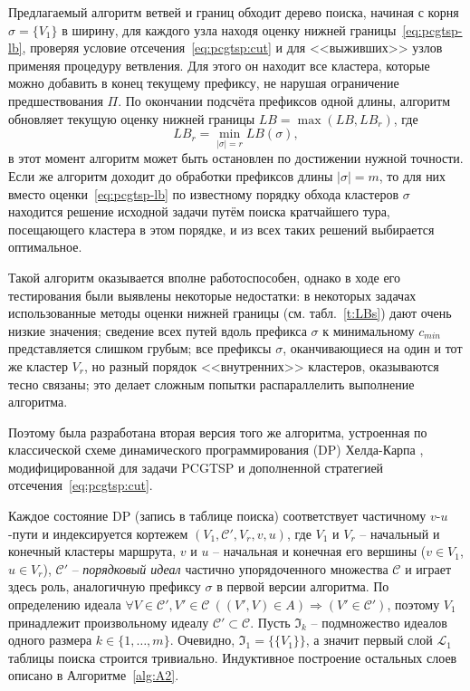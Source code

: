 Предлагаемый алгоритм ветвей и границ обходит дерево поиска,
начиная с корня
$\sigma=\{V_1\}$
в ширину,
для каждого узла
находя оценку нижней границы~\eqref{eq:pcgtsp-lb},
проверяя условие отсечения~\eqref{eq:pcgtsp:cut}
и для <<выживших>> узлов применяя процедуру ветвления.
Для этого он находит все кластера,
которые можно добавить в конец текущему префиксу,
не нарушая ограничение предшествования $\Pi$.
По окончании подсчёта префиксов одной длины,
алгоритм обновляет текущую оценку нижней границы
$
LB = \max(LB, LB_r)
$,
где
$$
LB_r = \min_{|\sigma|=r} LB(\sigma),
$$
в этот момент алгоритм может быть остановлен
по достижении нужной точности.
Если же алгоритм доходит до обработки
префиксов длины
$|\sigma|=m$,
то для них вместо оценки~\eqref{eq:pcgtsp-lb}
по известному порядку обхода кластеров $\sigma$
находится решение исходной задачи путём поиска кратчайшего тура,
посещающего кластера в этом порядке,
и из всех таких решений выбирается оптимальное.

Такой алгоритм оказывается вполне работоспособен,
однако в ходе его тестирования были выявлены некоторые недостатки:
  в некоторых задачах использованные методы
  оценки нижней границы
  (см. табл.~\ref{t:LBs})
  дают очень низкие значения;
  сведение всех путей вдоль префикса $\sigma$
  к минимальному $c_{min}$
  представляется слишком грубым;
  все префиксы $\sigma$,
  оканчивающиеся на один и тот же
  кластер $V_r$,
  но разный порядок <<внутренних>> кластеров,
  оказываются тесно связаны;
  это делает сложным попытки распараллелить
  выполнение алгоритма.

Поэтому была разработана вторая версия того же алгоритма,
устроенная по классической схеме
динамического программирования (DP)
Хелда-Карпа
\autocite{HeldKarp1962},
модифицированной для задачи PCGTSP
и дополненной стратегией отсечения~\eqref{eq:pcgtsp:cut}.

Каждое состояние DP
(запись в таблице поиска)
соответствует частичному
$v$-$u$-пути
и индексируется кортежем
$(V_1, \mathcal C',V_r,v, u)$, где
$V_1$ и $V_r$ -- начальный и конечный кластеры маршрута,
$v$ и $u$ -- начальная и конечная его вершины ($v\in V_1$, $u\in V_r$),
$\mathcal C'$ -- {\it порядковый идеал} частично упорядоченного множества $\mathcal C$
и играет здесь роль, аналогичную префиксу $\sigma$
в первой версии алгоритма.
По определению идеала
\(
    \forall V\in\mathcal C', V'\in\mathcal C\
    \left((V',V)\in A\right)
    \Rightarrow (V'\in\mathcal C')
\),
поэтому $V_1$
принадлежит произвольному идеалу
$\mathcal C'\subset\mathcal C$.
Пусть $\mathfrak I_k$
-- подмножество идеалов одного размера
$k\in\{1,\ldots,m\}$.
Очевидно,
$\mathfrak I_1=\{\{V_1\}\}$,
а значит первый слой
$\mathcal L_1$
таблицы поиска строится тривиально.
Индуктивное построение остальных слоев
описано в Алгоритме~\ref{alg:A2}.

